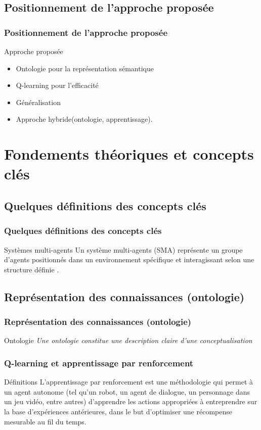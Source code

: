 \documentclass[11pt]{beamer}
\begin{document}
\subsection{Positionnement de l’approche proposée}
\begin{frame}
\frametitle{Positionnement de l’approche proposée}
\begin{block}{Approche proposée}
    \begin{itemize}
        \item Ontologie pour la représentation sémantique
        \item Q-learning pour l’efficacité
        \item Généralisation 
        \item Approche hybride(ontologie, apprentissage).
    \end{itemize}
\end{block}
    
\end{frame}
\section{Fondements théoriques et concepts clés}

\subsection{Quelques définitions des concepts clés}
\begin{frame}
\frametitle{Quelques définitions des concepts clés}
\begin{block}{Systèmes multi-agents}
    Un système multi-agents (SMA) représente un groupe d’agents positionnés dans un
environnement spécifique et interagissant selon une structure définie .
\end{block}
\end{frame}
\subsection{Représentation des connaissances (ontologie)}
\begin{frame}
\frametitle{Représentation des connaissances (ontologie)}
\begin{block}{Ontologie}
\textit{ Une ontologie constitue une description claire d’une conceptualisation}   
\end{block}  
\end{frame}
\begin{frame}
    \frametitle{Q-learning et apprentissage par renforcement}
    \begin{block}{Définitions}
        L’apprentissage par renforcement est une méthodologie qui permet à un agent autonome (tel qu’un robot, un agent de dialogue, un personnage dans un jeu vidéo, entre autres) d’apprendre les actions appropriées à entreprendre sur la base d’expériences antérieures, dans le but d’optimiser une récompense mesurable au fil du temps.   
    \end{block}
\end{frame}
\end{document}
